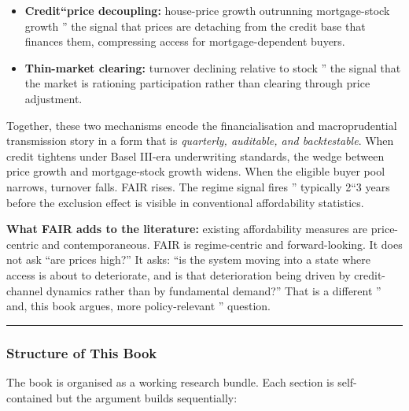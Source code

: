 \documentclass[
]{article}
\providecommand{\tightlist}{%
  \setlength{\itemsep}{0pt}\setlength{\parskip}{0pt}}
\begin{document}
\begin{itemize}
\tightlist
\item
  \textbf{Credit``price decoupling:} house-price growth outrunning
  mortgage-stock growth '' the signal that prices are detaching from the
  credit base that finances them, compressing access for
  mortgage-dependent buyers.
\item
  \textbf{Thin-market clearing:} turnover declining relative to stock ''
  the signal that the market is rationing participation rather than
  clearing through price adjustment.
\end{itemize}

Together, these two mechanisms encode the financialisation and
macroprudential transmission story in a form that is \emph{quarterly,
auditable, and backtestable}. When credit tightens under Basel III-era
underwriting standards, the wedge between price growth and
mortgage-stock growth widens. When the eligible buyer pool narrows,
turnover falls. FAIR rises. The regime signal fires '' typically 2``3
years before the exclusion effect is visible in conventional
affordability statistics.

\textbf{What FAIR adds to the literature:} existing affordability
measures are price-centric and contemporaneous. FAIR is regime-centric
and forward-looking. It does not ask ``are prices high?'' It asks: ``is
the system moving into a state where access is about to deteriorate, and
is that deterioration being driven by credit-channel dynamics rather
than by fundamental demand?'' That is a different '' and, this book
argues, more policy-relevant '' question.

\begin{center}\rule{0.5\linewidth}{0.5pt}\end{center}

\subsubsection{Structure of This Book}\label{structure-of-this-book}

The book is organised as a working research bundle. Each section is
self-contained but the argument builds sequentially:
\end{document}
